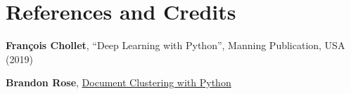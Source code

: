 \documentclass[11pt]{article}
\begin{document}
    

    \hypertarget{references-and-credits}{%
\section{References and Credits}\label{references-and-credits}}

\textbf{François Chollet}, ``Deep Learning with Python'', Manning
Publication, USA (2019)

\textbf{Brandon Rose},
\href{Document\%20Clustering\%20with\%20Python}{Document Clustering with
Python}


    
    
    
\end{document}
